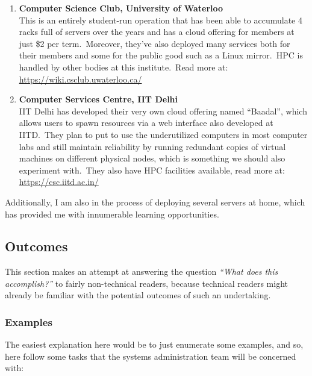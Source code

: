 \begin{enumerate}
    \item \textbf{Computer Science Club, University of Waterloo}\\
    This is an entirely student-run operation that has been able to accumulate 4 racks full of servers over the
    years and has a cloud offering for members at just \$2 per term.\ Moreover, they've also deployed many services
    both for their members and some for the public good such as a Linux mirror.\ HPC is handled by other bodies at
    this institute.\ Read more at:\\
    \href{https://wiki.csclub.uwaterloo.ca/}{\color{blue}\url{https://wiki.csclub.uwaterloo.ca/}}

    \item \textbf{Computer Services Centre, IIT Delhi}\\
    IIT Delhi has developed their very own cloud offering named ``Baadal'', which allows users to spawn resources
    via a web interface also developed at IITD.\ They plan to put to use the underutilized computers in most
    computer labs and still maintain reliability by running redundant copies of virtual machines on different
    physical nodes, which is something we should also experiment with.\ They also have HPC facilities available,
    read more at:\\
    \href{https://csc.iitd.ac.in/}{\color{blue}\url{https://csc.iitd.ac.in/}}
\end{enumerate}

Additionally, I am also in the process of deploying several servers at home, which has provided me with innumerable
learning opportunities.


\subsection{Outcomes}\label{subsec:outcomes}
This section makes an attempt at answering the question \emph{``What does this accomplish?''} to fairly
non-technical readers, because technical readers might already be familiar with the potential outcomes of such an
undertaking.

\subsubsection{Examples}
The easiest explanation here would be to just enumerate some examples, and so, here follow some tasks that the
systems administration team will be concerned with:

